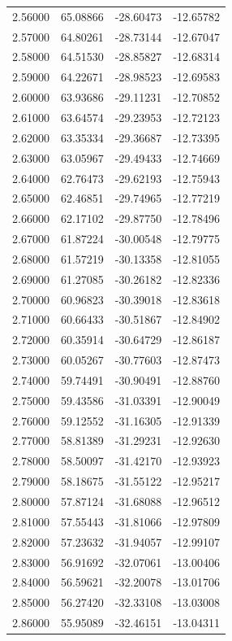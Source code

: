 \begin{table}
\begin{tabular}{llll}
2.56000 & 65.08866 & -28.60473 & -12.65782 \\
2.57000 & 64.80261 & -28.73144 & -12.67047 \\
2.58000 & 64.51530 & -28.85827 & -12.68314 \\
2.59000 & 64.22671 & -28.98523 & -12.69583 \\
2.60000 & 63.93686 & -29.11231 & -12.70852 \\
2.61000 & 63.64574 & -29.23953 & -12.72123 \\
2.62000 & 63.35334 & -29.36687 & -12.73395 \\
2.63000 & 63.05967 & -29.49433 & -12.74669 \\
2.64000 & 62.76473 & -29.62193 & -12.75943 \\
2.65000 & 62.46851 & -29.74965 & -12.77219 \\
2.66000 & 62.17102 & -29.87750 & -12.78496 \\
2.67000 & 61.87224 & -30.00548 & -12.79775 \\
2.68000 & 61.57219 & -30.13358 & -12.81055 \\
2.69000 & 61.27085 & -30.26182 & -12.82336 \\
2.70000 & 60.96823 & -30.39018 & -12.83618 \\
2.71000 & 60.66433 & -30.51867 & -12.84902 \\
2.72000 & 60.35914 & -30.64729 & -12.86187 \\
2.73000 & 60.05267 & -30.77603 & -12.87473 \\
2.74000 & 59.74491 & -30.90491 & -12.88760 \\
2.75000 & 59.43586 & -31.03391 & -12.90049 \\
2.76000 & 59.12552 & -31.16305 & -12.91339 \\
2.77000 & 58.81389 & -31.29231 & -12.92630 \\
2.78000 & 58.50097 & -31.42170 & -12.93923 \\
2.79000 & 58.18675 & -31.55122 & -12.95217 \\
2.80000 & 57.87124 & -31.68088 & -12.96512 \\
2.81000 & 57.55443 & -31.81066 & -12.97809 \\
2.82000 & 57.23632 & -31.94057 & -12.99107 \\
2.83000 & 56.91692 & -32.07061 & -13.00406 \\
2.84000 & 56.59621 & -32.20078 & -13.01706 \\
2.85000 & 56.27420 & -32.33108 & -13.03008 \\
2.86000 & 55.95089 & -32.46151 & -13.04311 \\

\end{tabular}
\end{table}
